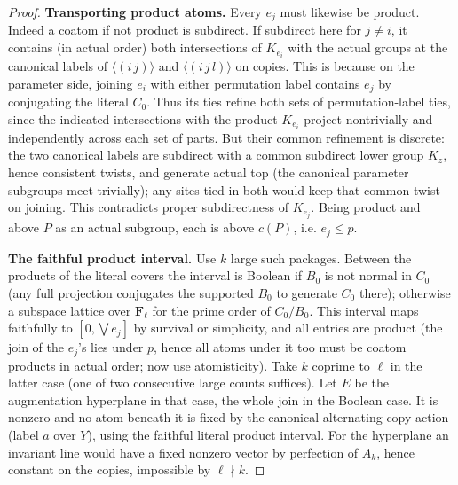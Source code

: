 \begin{proof}
\noindent\textbf{Transporting product atoms.} Every \(e_j\) must likewise be product. Indeed a coatom if not product is subdirect. If subdirect here for \(j\ne i\), it contains (in actual order) both intersections of \(K_{e_i}\) with the actual groups at the canonical labels of \(\langle(i\,j)\rangle\) and \(\langle(i\,j\,l)\rangle\) on copies. This is because on the parameter side, joining \(e_i\) with either permutation label contains \(e_j\) by conjugating the literal \(C_0\). Thus its ties refine both sets of permutation-label ties, since the indicated intersections with the product \(K_{e_i}\) project nontrivially and independently across each set of parts. But their common refinement is discrete: the two canonical labels are subdirect with a common subdirect lower group \(K_z\), hence consistent twists, and generate actual top (the canonical parameter subgroups meet trivially); any sites tied in both would keep that common twist on joining. This contradicts proper subdirectness of \(K_{e_j}\). Being product and above \(P\) as an actual subgroup, each is above \(c(P)\), i.e. \(e_j\le p\).

\noindent\textbf{The faithful product interval.} Use \(k\) large such packages. Between the products of the literal covers the interval is Boolean if \(B_0\) is not normal in \(C_0\) (any full projection conjugates the supported \(B_0\) to generate \(C_0\) there); otherwise a subspace lattice over \(\mathbf F_\ell\) for the prime order of \(C_0/B_0\). This interval maps faithfully to \([0,\bigvee e_j]\) by survival or simplicity, and all entries are product (the join of the \(e_j\)'s lies under \(p\), hence all atoms under it too must be coatom products in actual order; now use atomisticity). Take \(k\) coprime to \(\ell\) in the latter case (one of two consecutive large counts suffices). Let \(E\) be the augmentation hyperplane in that case, the whole join in the Boolean case. It is nonzero and no atom beneath it is fixed by the canonical alternating copy action (label \(a\) over \(Y\)), using the faithful literal product interval. For the hyperplane an invariant line would have a fixed nonzero vector by perfection of \(A_k\), hence constant on the copies, impossible by \(\ell\nmid k\).


\end{proof}
